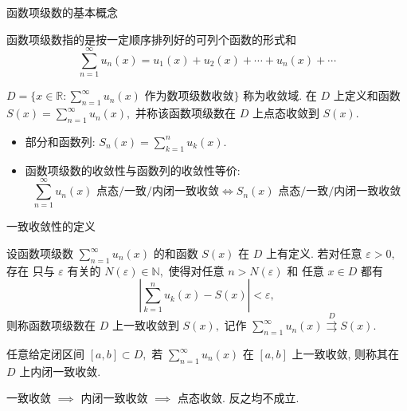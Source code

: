 
\begin{frame}{函数项级数的基本概念}

\begin{Def}[函数项级数]
函数项级数指的是{\color{red}按一定顺序排列好}的可列个函数的形式和
\[\sum_{n=1}^\infty u_n(x) = u_1(x) + u_2(x) + \cdots + u_n(x) + \cdots\]
\end{Def}

\pause

\begin{Def}[收敛域与和函数]
$D = \{ x \in \mathbb{R}: \sum_{n=1}^\infty u_n(x) \text{ 作为数项级数收敛} \}$ 称为收敛域.
在 $D$ 上定义和函数 $S(x) = \sum_{n=1}^\infty u_n(x),$ 并称该函数项级数在 $D$ 上{\color{red}点态收敛}到 $S(x).$
\end{Def}

\pause

\begin{itemize}[<+->]
\item 部分和函数列: $S_n(x) = \sum_{k=1}^n u_k(x).$
\item 函数项级数的收敛性与函数列的收敛性等价:
\[\sum_{n=1}^\infty u_n(x) \text{ 点态/一致/内闭一致收敛} \Longleftrightarrow S_n(x) \text{ 点态/一致/内闭一致收敛}\]
\end{itemize}

\end{frame}


\begin{frame}{一致收敛性的定义}

\begin{Def}[一致收敛]
设函数项级数 $\sum_{n=1}^\infty u_n(x)$ 的和函数 $S(x)$ 在 $D$ 上有定义. 若对任意 $\varepsilon > 0,$ 存在 {\color{red}只与 $\varepsilon$ 有关的} $N(\varepsilon) \in \mathbb{N},$ 使得对任意 $n > N(\varepsilon)$ 和 {\color{red}任意 $x \in D$} 都有
\[\left\lvert \sum_{k=1}^n u_k(x) - S(x) \right\rvert < \varepsilon,\]
则称函数项级数在 $D$ 上一致收敛到 $S(x),$ 记作 $\sum_{n=1}^\infty u_n(x) \stackrel{D}{\rightrightarrows} S(x).$
\end{Def}

\pause

\begin{Def}[内闭一致收敛]
任意给定闭区间 $[a, b] \subset D,$ 若 $\sum_{n=1}^\infty u_n(x)$ 在 $[a, b]$ 上一致收敛, 则称其在 $D$ 上内闭一致收敛.
\end{Def}

\pause

\begin{attnblock}
一致收敛 $\implies$ 内闭一致收敛 $\implies$ 点态收敛. 反之均不成立.
\end{attnblock}

\end{frame}

